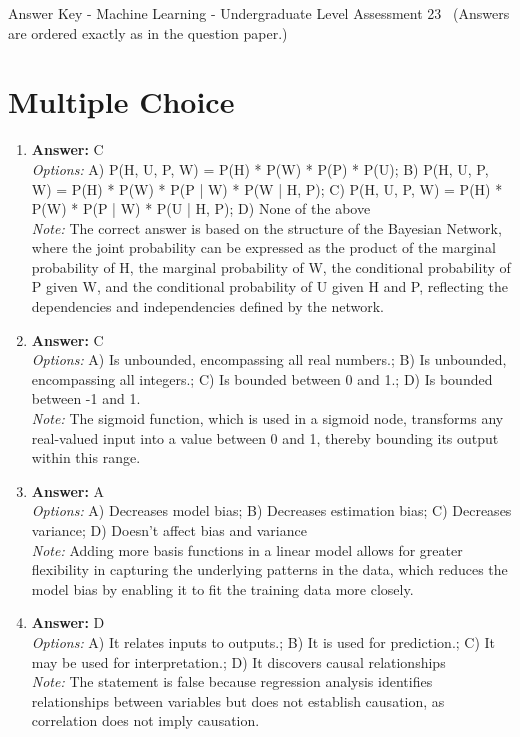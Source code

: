 \documentclass[12pt]{article}
\begin{document}
\begin{center}
Answer Key - Machine Learning - Undergraduate Level Assessment 23 \
\small (Answers are ordered exactly as in the question paper.)
\end{center}

\section*{Multiple Choice}
\begin{enumerate}[label=\arabic*.]
\item \textbf{Answer:} C
\\ \textit{Options:} A) P(H, U, P, W) = P(H) * P(W) * P(P) * P(U); B) P(H, U, P, W) = P(H) * P(W) * P(P | W) * P(W | H, P); C) P(H, U, P, W) = P(H) * P(W) * P(P | W) * P(U | H, P); D) None of the above
\\ \textit{Note:} The correct answer is based on the structure of the Bayesian Network, where the joint probability can be expressed as the product of the marginal probability of H, the marginal probability of W, the conditional probability of P given W, and the conditional probability of U given H and P, reflecting the dependencies and independencies defined by the network.
\item \textbf{Answer:} C
\\ \textit{Options:} A) Is unbounded, encompassing all real numbers.; B) Is unbounded, encompassing all integers.; C) Is bounded between 0 and 1.; D) Is bounded between -1 and 1.
\\ \textit{Note:} The sigmoid function, which is used in a sigmoid node, transforms any real-valued input into a value between 0 and 1, thereby bounding its output within this range.
\item \textbf{Answer:} A
\\ \textit{Options:} A) Decreases model bias; B) Decreases estimation bias; C) Decreases variance; D) Doesn't affect bias and variance
\\ \textit{Note:} Adding more basis functions in a linear model allows for greater flexibility in capturing the underlying patterns in the data, which reduces the model bias by enabling it to fit the training data more closely.
\item \textbf{Answer:} D
\\ \textit{Options:} A) It relates inputs to outputs.; B) It is used for prediction.; C) It may be used for interpretation.; D) It discovers causal relationships
\\ \textit{Note:} The statement is false because regression analysis identifies relationships between variables but does not establish causation, as correlation does not imply causation.

\end{enumerate}
\end{document}
